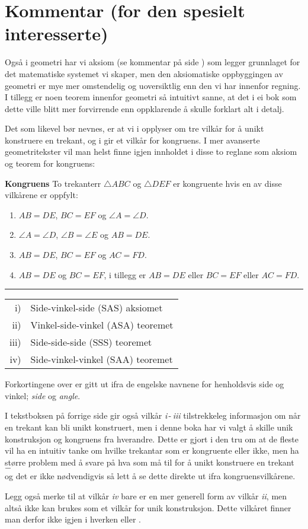 



\section*{Kommentar (for den spesielt interesserte)}
Også i geometri har vi aksiom (se kommentar på side \pageref{Kommentar1}) som legger grunnlaget for det matematiske systemet vi skaper, men den aksiomatiske oppbyggingen av geometri er mye mer omstendelig og uoversiktlig enn den vi har innenfor regning. I tillegg er noen teorem innenfor geometri så intuitivt sanne, at det i ei bok som dette ville blitt mer forvirrende enn oppklarende å skulle forklart alt i detalj.\vsk

Det som likevel bør nevnes, er at vi i  opplyser om tre vilkår for å unikt konstruere en trekant, og i  gir et vilkår for kongruens. I mer avanserte geometritekster vil man helst finne igjen innholdet i disse to reglane som aksiom og teorem for kongruens: \regv

\begin{tcolorbox}[boxrule=0.3 mm,arc=0mm,colback=blue!5] {\large \textbf{Kongruens} \vspace{5 pt}}\newline
	To trekanterr $ \triangle ABC $ og $ \triangle DEF $ er kongruente hvis en av disse vilkårene er oppfylt:
	\begin{enumerate}[label=\roman*)]
		\item $ AB=DE $, $ BC=EF $ og $ \angle A=\angle D $.
		\item $ \angle A=\angle D $, $ \angle B=\angle E $ og $ AB=DE $.
		\item $ AB=DE $, $ BC=EF $ og $ AC=FD $.
		\item $ AB=DE $ og $ BC=EF $, i tillegg er $ AB=DE $ eller $ BC=EF $ eller $ AC=FD $.
	\end{enumerate}
\rule{1\linewidth}{0.75bp}
\begin{center}
	\begin{tabular}{rl}
		i) &Side-vinkel-side (SAS) aksiomet\\
		ii) &Vinkel-side-vinkel (ASA) teoremet\\
		iii) & Side-side-side (SSS) teoremet \\
		iv) & Side-vinkel-vinkel (SAA) teoremet 
	\end{tabular}
\end{center}
\mer Forkortingene over er gitt ut ifra de engelske navnene for henholdsvis side og vinkel; \textit{side} og \textit{angle}.
\end{tcolorbox}
\newpage
I tekstboksen på forrige side gir også vilkår \textsl{i}\,-\,\textsl{iii} tilstrekkeleg informasjon om når en trekant kan bli unikt konstruert, men i denne boka har vi valgt å skille unik konstruksjon og kongruens fra hverandre. Dette er gjort i den tru om at de fleste vil ha en intuitiv tanke om hvilke trekantar som er kongruente eller ikke, men ha større problem med å svare på hva som må til for å unikt konstruere en trekant $ - $ \\og det er ikke nødvendigvis så lett å se dette direkte ut ifra kongruensvilkårene.\vsk

Legg også merke til at vilkår \textsl{iv} bare er en mer generell form av vilkår \textsl{ii}, men altså ikke kan brukes som et vilkår for unik konstruksjon. Dette vilkåret finner man derfor ikke igjen i hverken  eller .


